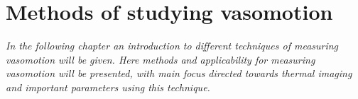 \chapter{Methods of studying vasomotion}

\textit{In the following chapter an introduction to different techniques of measuring vasomotion will be given. Here methods and applicability for measuring vasomotion will be presented, with main focus directed towards thermal imaging and important parameters using this technique. }